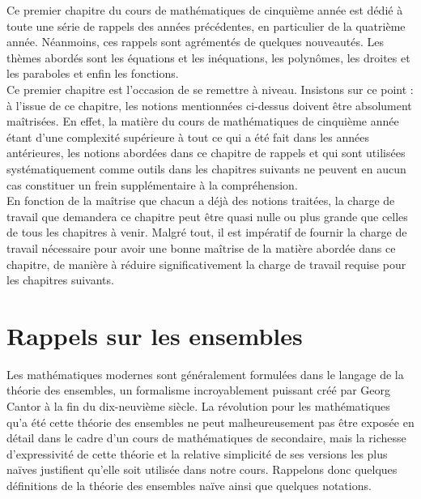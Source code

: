 \documentclass[a4paper,13pt]{scrreprt}
\theoremstyle{plain}
\theoremstyle{definition}
\begin{document}
Ce premier chapitre du cours de mathématiques de cinquième année est dédié à toute une série de rappels des années précédentes, en particulier de la quatrième année. Néanmoins, ces rappels sont agrémentés de quelques nouveautés. Les thèmes abordés sont les équations et les inéquations, les polynômes, les droites et les paraboles et enfin les fonctions. \\
Ce premier chapitre est l'occasion de se remettre à niveau. Insistons sur ce point : à l'issue de ce chapitre, les notions mentionnées ci-dessus doivent être absolument maîtrisées. En effet, la matière du cours de mathématiques de cinquième année étant d'une complexité supérieure à tout ce qui a été fait dans les années antérieures, les notions abordées dans ce chapitre de rappels et qui sont utilisées systématiquement comme outils dans les chapitres suivants ne peuvent en aucun cas constituer un frein supplémentaire à la compréhension. \\
En fonction de la maîtrise que chacun a déjà des notions traitées, la charge de travail que demandera ce chapitre peut être quasi nulle ou plus grande que celles de tous les chapitres à venir. Malgré tout, il est impératif de fournir la charge de travail nécessaire pour avoir une bonne maîtrise de la matière abordée dans ce chapitre, de manière à réduire significativement la charge de travail requise pour les chapitres suivants.

\section{Rappels sur les ensembles}

Les mathématiques modernes sont généralement formulées dans le langage de la théorie des ensembles, un formalisme incroyablement puissant créé par Georg Cantor à la fin du dix-neuvième siècle. La révolution pour les mathématiques qu'a été cette théorie des ensembles ne peut malheureusement pas être exposée en détail dans le cadre d'un cours de mathématiques de secondaire, mais la richesse d'expressivité de cette théorie et la relative simplicité de ses versions les plus naïves justifient qu'elle soit utilisée dans notre cours. Rappelons donc quelques définitions de la théorie des ensembles naïve ainsi que quelques notations.

\newpage
\end{document}
